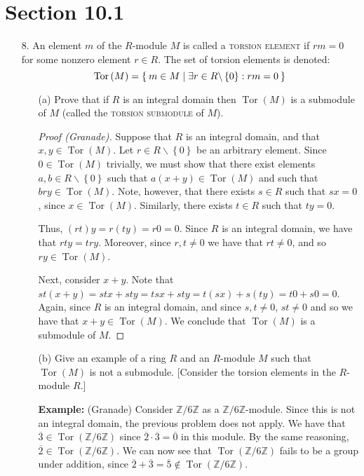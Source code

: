 \documentclass[10pt]{article}
\newcommand{\Z}{\mathbb{Z}}
\newcommand{\tor}{\operatorname{Tor}}
\newcommand{\noun}[1]{\textsc{#1}}
\begin{document}
\section*{Section 10.1}

\begin{itemize}

\item [8.] An element $m$ of the $R$-module $M$ is called a \noun{torsion
element} if $rm=0$ for some nonzero element $r\in R$. The set of
torsion elements is denoted:\[ \tor\left(M\right)=\Set{m\in
M|\exists r\in R\backslash\left\{ 0\right\} :rm=0}\]


\begin{itemize}
\item [(a)] Prove that if $R$ is an integral domain then $\tor\left(M\right)$
is a submodule of $M$ (called the \noun{torsion submodule} of $M$).

\begin{proof}
[Proof (Granade)] Suppose that $R$ is an integral domain, and that
$x,y\in\tor\left(M\right)$. Let $r\in R\backslash\left\{ 0\right\} $
be an arbitrary element. Since $0\in\tor\left(M\right)$ trivially,
we must show that there exist elements $a,b\in R\backslash\left\{
0\right\} $ such that $a\left(x+y\right)\in\tor\left(M\right)$ and
such that $bry\in\tor\left(M\right)$. Note, however, that there
exists $s\in R$ such that $sx=0$, since $x\in\tor\left(M\right)$.
Similarly, there exists $t\in R$ such that $ty=0$.

Thus, $\left(rt\right)y=r\left(ty\right)=r0=0$. Since $R$ is an
integral domain, we have that $rty=try$. Moreover, since $r,t\ne0$
we have that $rt\ne0$, and so $ry\in\tor\left(M\right)$.

Next, consider $x+y$. Note that
$st\left(x+y\right)=stx+sty=tsx+sty=t\left(sx\right)+s\left(ty\right)=t0+s0=0$.
Again, since $R$ is an integral domain, and since $s,t\ne0$,
$st\ne0$ and so we have that $x+y\in\tor\left(M\right)$. We conclude
that $\tor\left(M\right)$ is a submodule of $M$.
\end{proof}
\item [(b)]Give an example of a ring $R$ and an $R$-module $M$ such
that $\tor\left(M\right)$ is not a submodule. {[}Consider the
torsion elements in the $R$-module $R$.]

{\bf Example:} (Granade) Consider $\Z/6\Z$ as a $\Z/6\Z$-module.
Since this is not an integral domain, the previous problem does not
apply. We have that $\overline{3}\in\tor\left(\Z/6\Z\right)$ since
$\overline{2}\cdot\overline{3}=\overline{0}$ in this module. By the
same reasoning, $\overline{2}\in\tor\left(\Z/6\Z\right)$. We can now
see that $\tor\left(\Z/6\Z\right)$ fails to be a group under
addition, since
$\overline{2}+\overline{3}=\overline{5}\notin\tor\left(\Z/6\Z\right)$.


\end{itemize}
\end{itemize}
\end{document}
